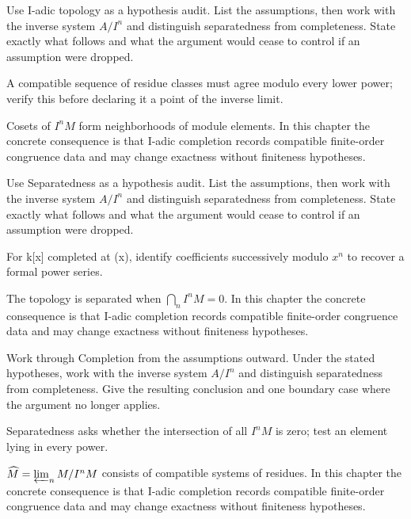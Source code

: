 \begin{exercise}\label{exr:v18-02}
Use I-adic topology as a hypothesis audit. List the assumptions, then work with the inverse system \(A/I^n\) and distinguish separatedness from completeness. State exactly what follows and what the argument would cease to control if an assumption were dropped.
\end{exercise}
\begin{hint}
A compatible sequence of residue classes must agree modulo every lower power; verify this before declaring it a point of the inverse limit.
\end{hint}
\begin{solution}
Cosets of $I^nM$ form neighborhoods of module elements. In this chapter the concrete consequence is that I-adic completion records compatible finite-order congruence data and may change exactness without finiteness hypotheses.
\end{solution}

\begin{exercise}\label{exr:v18-03}
Use Separatedness as a hypothesis audit. List the assumptions, then work with the inverse system \(A/I^n\) and distinguish separatedness from completeness. State exactly what follows and what the argument would cease to control if an assumption were dropped.
\end{exercise}
\begin{hint}
For k[x] completed at (x), identify coefficients successively modulo \(x^n\) to recover a formal power series.
\end{hint}
\begin{solution}
The topology is separated when $\bigcap_n I^nM=0$. In this chapter the concrete consequence is that I-adic completion records compatible finite-order congruence data and may change exactness without finiteness hypotheses.
\end{solution}

\begin{exercise}\label{exr:v18-04}
Work through Completion from the assumptions outward. Under the stated hypotheses, work with the inverse system \(A/I^n\) and distinguish separatedness from completeness. Give the resulting conclusion and one boundary case where the argument no longer applies.
\end{exercise}
\begin{hint}
Separatedness asks whether the intersection of all \(I^nM\) is zero; test an element lying in every power.
\end{hint}
\begin{solution}
$\widehat M=\varprojlim_n M/I^nM$ consists of compatible systems of residues. In this chapter the concrete consequence is that I-adic completion records compatible finite-order congruence data and may change exactness without finiteness hypotheses.
\end{solution}


